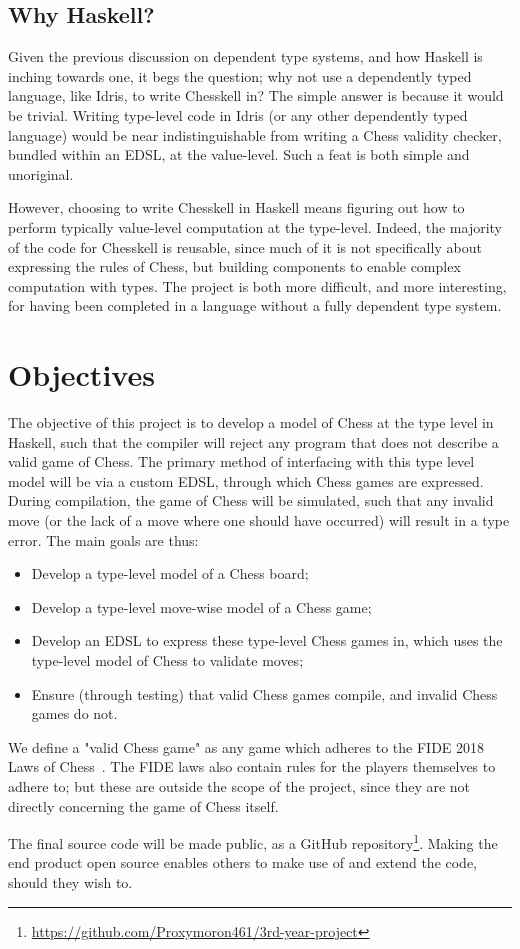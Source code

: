 \subsection{Why Haskell?}

Given the previous discussion on dependent type systems, and how Haskell is inching towards one, it begs the question; why not use a dependently typed language, like Idris, to write Chesskell in? The simple answer is because it would be trivial. Writing type-level code in Idris (or any other dependently typed language) would be near indistinguishable from writing a Chess validity checker, bundled within an EDSL, at the value-level. Such a feat is both simple and unoriginal.

However, choosing to write Chesskell in Haskell means figuring out how to perform typically value-level computation at the type-level. Indeed, the majority of the code for Chesskell is reusable, since much of it is not specifically about expressing the rules of Chess, but building components to enable complex computation with types. The project is both more difficult, and more interesting, for having been completed in a language without a fully dependent type system.

\section{Objectives} \label{introobjectives}

The objective of this project is to develop a model of Chess at the type level in Haskell, such that the compiler will reject any program that does not describe a valid game of Chess. The primary method of interfacing with this type level model will be via a custom EDSL, through which Chess games are expressed. During compilation, the game of Chess will be simulated, such that any invalid move (or the lack of a move where one should have occurred) will result in a type error. The main goals are thus:

\begin{itemize}
    \item Develop a type-level model of a Chess board;
    \item Develop a type-level move-wise model of a Chess game;
    \item Develop an EDSL to express these type-level Chess games in, which uses the type-level model of Chess to validate moves;
    \item Ensure (through testing) that valid Chess games compile, and invalid Chess games do not.
\end{itemize}

We define a "valid Chess game" as any game which adheres to the FIDE 2018 Laws of Chess~\cite{lawsofchess}. The FIDE laws also contain rules for the players themselves to adhere to; but these are outside the scope of the project, since they are not directly concerning the game of Chess itself.

The final source code will be made public, as a GitHub repository\footnote{\url{https://github.com/Proxymoron461/3rd-year-project}}. Making the end product open source enables others to make use of and extend the code, should they wish to.
